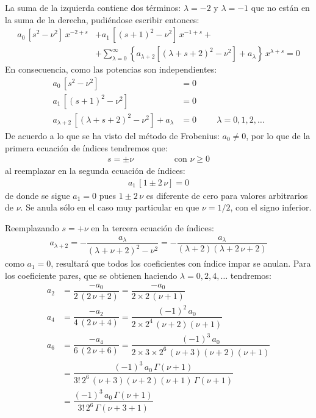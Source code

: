 La suma de la izquierda contiene dos términos: $\lambda=-2$ y $\lambda=-1$ que no están en la suma de la derecha, pudiéndose escribir entonces:
\begin{align*}
a_{0} \, [s^{2} - \nu^{2}] \, x^{-2+s} &+ a_{1} \, [(s+1)^{2} - \nu^{2}] \, x^{-1+s} + \\[0.5em]
&+ \sum_{\lambda=0}^{\infty} \left\{ a_{\lambda+2} [(\lambda + s + 2)^{2} - \nu^{2}] + a_{\lambda} \right\} \, x^{\lambda + s} = 0
\end{align*}
En consecuencia, como las potencias son independientes:
\begin{align*}
a_{0} \, [s^{2} - \nu^{2}] &= 0 \\[0.5em]
a_{1} \, [(s + 1)^{2} - \nu^{2}] &= 0 \\[0.5em]
a_{\lambda+2} \, [(\lambda + s + 2)^{2} - \nu^{2}] + a_{\lambda} &= 0 \hspace{1cm} \lambda=0, 1, 2, \ldots
\end{align*}
De acuerdo a lo que se ha visto del método de Frobenius: $a_{0} \neq 0$, por lo que de la primera ecuación de índices tendremos que:
\begin{align}
s = \pm \nu \hspace{2cm} \mbox{con } \nu \geq 0
\label{eq:ecuacion_08_04}
\end{align}
al reemplazar en la segunda ecuación de índices:
\begin{align*}
a_{1} \, [1 \pm 2 \, \nu] = 0
\end{align*}
de donde se sigue $a_{1} = 0$ pues $1 \pm 2 \, \nu$ es diferente de cero para valores arbitrarios de $\nu$. Se anula sólo en el caso muy particular en que $\nu = 1/2$, con el signo inferior.
\par
Reemplazando $s = + \nu$ en la tercera ecuación de índices:
\begin{align*}
a_{\lambda+2} = - \dfrac{a_{\lambda}}{(\lambda + \nu + 2)^{2} - \nu^{2}} = - \dfrac{a_{\lambda}}{(\lambda + 2)(\lambda + 2 \, \nu + 2)}
\end{align*}
como $a_{1} = 0$, resultará que todos los coeficientes con índice impar se anulan. Para los coeficiente pares, que se obtienen haciendo $\lambda = 0, 2, 4, \ldots$ tendremos:
\begin{align*}
a_{2} &= \dfrac{-a_{0}}{2 \, (2 \, \nu + 2)} = \dfrac{-a_{0}}{2 \times 2 \, (\nu + 1)} \\[0.5em]
a_{4} &= \dfrac{-a_{2}}{4 \, (2 \, \nu + 4)} = \dfrac{(-1)^{2} \, a_{0}}{2 \times 2^{4} \, (\nu + 2)(\nu + 1)} \\[0.5em]
a_{6} &= \dfrac{-a_{4}}{6 \, (2 \, \nu + 6)} = \dfrac{(-1)^{3} \, a_{0}}{2 \times 3 \times 2^{6} \, (\nu + 3)(\nu + 2)(\nu + 1)} \\[0.5em]
&= \dfrac{(-1)^{3} \, a_{0} \, \Gamma (\nu + 1)}{3! \, 2^{6} \, (\nu + 3)(\nu + 2)(\nu + 1) \, \Gamma (\nu + 1)} \\[0.5em]
&= \dfrac{(-1)^{3} \, a_{0} \, \Gamma (\nu + 1)}{3! \, 2^{6} \, \Gamma (\nu + 3 + 1)}
\end{align*}
